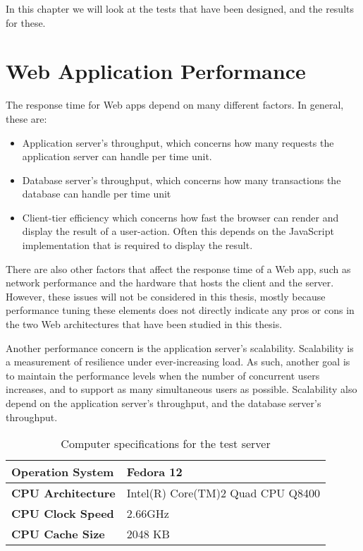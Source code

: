 In this chapter we will look at the tests that have been designed, and the results for these.

\section{Web Application Performance}
The response time for Web apps depend on many different factors. In general, these are:
\begin{itemize} 
\item{} Application server's throughput, which concerns how many requests the application server can handle per time unit. 
\item {} Database server's throughput, which concerns how many transactions the database can handle per time unit
\item{} Client-tier efficiency which concerns how fast the browser can render and display the result of a user-action. Often this depends on the JavaScript implementation that is required to display the result.
\end{itemize}
There are also other factors that affect the response time of a Web app, such as network performance and the hardware that hosts the client and the server. However, these issues will not be considered in this thesis, mostly because performance tuning these elements does not directly indicate any pros or cons in the two Web architectures that have been studied in this thesis. 

Another performance concern is the application server's scalability. Scalability is a measurement of resilience under ever-increasing load. As such, another goal is to maintain the performance levels when the number of concurrent users increases, and to support as many simultaneous users as possible. Scalability also depend on the application server's throughput, and the database server's throughput. 

\begin{table}
    \begin{tabular}{| l | l |}
    \hline
    \textbf{Operation System} & Fedora 12                         \\ \hline
    \textbf{CPU Architecture} & Intel(R) Core(TM)2 Quad CPU Q8400 \\ \hline
    \textbf{CPU Clock Speed}  & 2.66GHz                           \\ \hline
    \textbf{CPU Cache Size}   & 2048 KB                           \\ \hline
    \end{tabular}
    \caption{Computer specifications for the test server}
    \label{table:machines}
\end{table}

